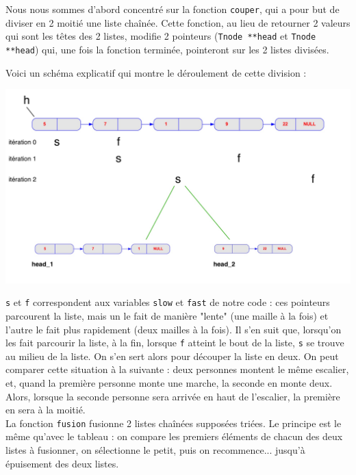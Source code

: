 \documentclass[11pt]{article}
\begin{document}
Nous nous sommes d'abord concentré sur la fonction \texttt{couper}, qui a pour but de diviser en 2 moitié une liste chaînée. Cette fonction, au lieu de retourner 2 valeurs qui sont les têtes des 2 listes, modifie 2 pointeurs (\texttt{T\textunderscore node **head} et \texttt{T\textunderscore node **head}) qui, une fois la fonction terminée, pointeront sur les 2 listes divisées.

Voici un schéma explicatif qui montre le déroulement de cette division : 

\begin{center}
\includegraphics[scale=0.25]{images/2.jpg}
\end{center}

\texttt{s} et \texttt{f} correspondent aux variables \texttt{slow} et \texttt{fast} de notre code : ces pointeurs parcourent la liste, mais un le fait de manière "lente" (une maille à la fois) et l'autre le fait plus rapidement (deux mailles à la fois). Il s'en suit que, lorsqu'on les fait parcourir la liste, à la fin, lorsque \texttt{f} atteint le bout de la liste, \texttt{s} se trouve au milieu de la liste. On s'en sert alors pour découper la liste en deux. On peut comparer cette situation à la suivante : deux personnes montent le même escalier, et, quand la première personne monte une marche, la seconde en monte deux. Alors, lorsque la seconde personne sera arrivée en haut de l'escalier, la première en sera à la moitié. \\


La fonction \texttt{fusion} fusionne 2 listes chaînées supposées triées. Le principe est le même qu'avec le tableau : on compare les premiers éléments de chacun des deux listes à fusionner, on sélectionne le petit, puis on recommence... jusqu'à épuisement des deux listes. \\
\end{document}
